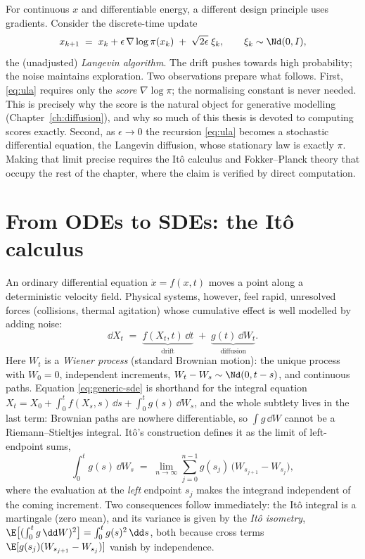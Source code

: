 For continuous $x$ and differentiable energy, a different design
principle uses gradients. Consider the discrete-time update
\begin{equation}
  x_{k+1} \;=\; x_k + \epsilon\, \nabla \log \pi(x_k)
  \;+\; \sqrt{2\epsilon}\; \xi_k ,
  \qquad \xi_k \sim \Nd(0, I),
  \label{eq:ula}
\end{equation}
the (unadjusted) \emph{Langevin algorithm}. The drift pushes towards high
probability; the noise maintains exploration. Two observations prepare
what follows. First, \eqref{eq:ula} requires only the \emph{score}
$\nabla \log \pi$; the normalising constant is never needed. This is
precisely why the score is the natural object for generative modelling
(Chapter~\ref{ch:diffusion}), and why so much of this thesis is devoted
to computing scores exactly. Second, as $\epsilon \to 0$ the recursion
\eqref{eq:ula} becomes a stochastic differential equation, the Langevin
diffusion, whose stationary law is exactly $\pi$. Making that limit
precise requires the It\^o calculus and Fokker--Planck theory that occupy
the rest of the chapter, where the claim is verified by direct
computation.

\section{From ODEs to SDEs: the It\^o calculus}\label{sec:ode-to-sde}

An ordinary differential equation $\dot x = f(x, t)$ moves a point along
a deterministic velocity field. Physical systems, however, feel rapid,
unresolved forces (collisions, thermal agitation) whose cumulative effect
is well modelled by adding noise:
\begin{equation}
  \dd X_t \;=\; \underbrace{f(X_t, t)\,\dd t}_{\text{drift}}
  \;+\; \underbrace{g(t)\,\dd W_t}_{\text{diffusion}} .
  \label{eq:generic-sde}
\end{equation}
Here $W_t$ is a \emph{Wiener process} (standard Brownian motion): the
unique process with $W_0 = 0$, independent increments,
$W_t - W_s \sim \Nd(0, t-s)$, and continuous paths. Equation
\eqref{eq:generic-sde} is shorthand for the integral equation
$X_t = X_0 + \int_0^t f(X_s, s)\,\dd s + \int_0^t g(s)\,\dd W_s$, and the
whole subtlety lives in the last term: Brownian paths are nowhere
differentiable, so $\int g\,\dd W$ cannot be a Riemann--Stieltjes
integral. It\^o's construction \citep{ito1944stochastic} defines it as
the limit of left-endpoint sums,
\begin{equation}
  \int_0^t g(s)\, \dd W_s
  \;=\; \lim_{n \to \infty} \sum_{j=0}^{n-1}
        g(s_j)\,\big( W_{s_{j+1}} - W_{s_j} \big),
  \label{eq:ito-integral}
\end{equation}
where the evaluation at the \emph{left} endpoint $s_j$ makes the
integrand independent of the coming increment. Two consequences follow
immediately: the It\^o integral is a martingale (zero mean), and its
variance is given by the \emph{It\^o isometry},
$\E\big[ (\int_0^t g\,\dd W)^2 \big] = \int_0^t g(s)^2\,\dd s$, both
because cross terms $\E[g(s_j)(W_{s_{j+1}}-W_{s_j})]$ vanish by
independence.

